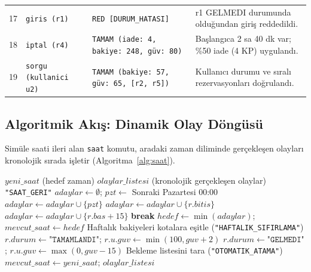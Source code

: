 \documentclass[conference]{IEEEtran}
\begin{document}
\begin{table}[!b]
{\begin{tabular}{clll}
17 & \texttt{giris (r1)} & \texttt{RED [DURUM\_HATASI]} & r1 GELMEDI durumunda olduğundan giriş reddedildi. \\
18 & \texttt{iptal (r4)} & \texttt{TAMAM (iade: 4, bakiye: 248, güv: 80)} & Başlangıca 2 sa 40 dk var; \%50 iade (4 KP) uygulandı. \\
19 & \texttt{sorgu (kullanici u2)} & \texttt{TAMAM (bakiye: 57, güv: 65, [r2, r5])} & Kullanıcı durumu ve sıralı rezervasyonları doğrulandı. \\
\bottomrule
\end{tabular}
}
\end{table}
\addtocounter{table}{-2}

\subsection{Algoritmik Akış: Dinamik Olay Döngüsü}
Simüle saati ileri alan \texttt{saat} komutu, aradaki zaman diliminde gerçekleşen olayları kronolojik sırada işletir (Algoritma~\ref{alg:saat}).

\begin{algorithm}[H]
\caption{K11 Simüle Saat İlerletme ve Dinamik Olay Döngüsü}
\label{alg:saat}
\scriptsize
\begin{algorithmic}[1]
\REQUIRE $yeni\_saat$ (hedef zaman)
\ENSURE $olaylar\_listesi$ (kronolojik gerçekleşen olaylar)
 \RETURN \texttt{"SAAT\_GERI"} \ENDIF
{}
    \STATE $adaylar \leftarrow \emptyset$; $pzt \leftarrow$ Sonraki Pazartesi 00:00
     \STATE $adaylar \leftarrow adaylar \cup \{pzt\}$ \ENDIF
        \STATE $adaylar \leftarrow adaylar \cup \{r.bitis\}$
    \ENDFOR
        \STATE $adaylar \leftarrow adaylar \cup \{r.bas+15\}$
    \ENDFOR
     \STATE \textbf{break} \ENDIF
    \STATE $hedef \leftarrow \min(adaylar)$; $mevcut\_saat \leftarrow hedef$
     \STATE Haftalık bakiyeleri kotalara eşitle (\texttt{"HAFTALIK\_SIFIRLAMA"}) \ENDIF
        \STATE $r.durum \leftarrow \texttt{"TAMAMLANDI"}$; $r.u.guv \leftarrow \min(100, guv+2)$
    \ENDFOR
        \STATE $r.durum \leftarrow \texttt{"GELMEDI"}$; $r.u.guv \leftarrow \max(0, guv-15)$
    \ENDFOR
        \STATE Bekleme listesini tara (\texttt{"OTOMATIK\_ATAMA"})
    \ENDFOR
\ENDWHILE
\STATE $mevcut\_saat \leftarrow yeni\_saat$; \RETURN $olaylar\_listesi$
\end{algorithmic}
\end{algorithm}
\end{document}
